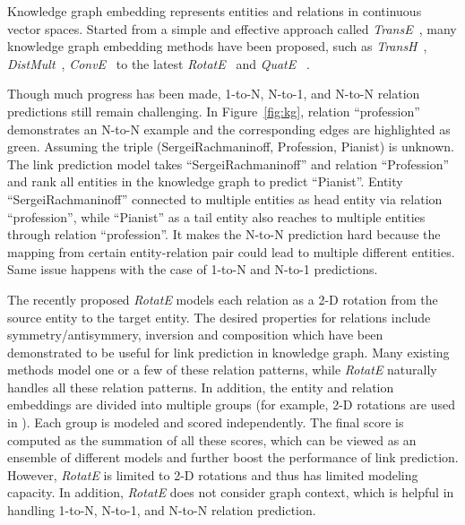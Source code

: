 \documentclass[11pt,a4paper]{article}
\begin{document}
Knowledge graph embedding represents entities and relations in continuous vector spaces.
Started from a simple and effective approach called {\it TransE}~\cite{bordes2013translating}, many knowledge graph embedding methods have been proposed, such as {\it TransH}~\cite{wang2014knowledge}, {\it DistMult}~\cite{yang2014distmult}, {\it ConvE}~\cite{dettmers2017conve} to the latest {\it RotatE}~\cite{Sun2019RotatEKG} and {\it QuatE }~\cite{zhang2019quaternion}.


Though much progress has been made, 1-to-N, N-to-1, and N-to-N relation predictions \cite{bordes2013translating,wang2014knowledge} still remain challenging. In Figure~\ref{fig:kg}, relation ``profession'' demonstrates an N-to-N example and the corresponding edges are highlighted as green. Assuming the triple (SergeiRachmaninoff, Profession, Pianist) is unknown.
The link prediction model takes ``SergeiRachmaninoff'' and relation ``Profession'' and rank all entities in the knowledge graph to predict ``Pianist''. Entity ``SergeiRachmaninoff'' connected to multiple  entities as head entity via relation ``profession'', while ``Pianist'' as a tail entity also reaches to multiple entities through relation ``profession''. It makes the N-to-N prediction hard because the mapping from certain entity-relation pair could lead to multiple different entities.
Same issue happens with the case of 1-to-N and N-to-1 predictions.

The recently proposed {\it RotatE} \cite{Sun2019RotatEKG} models each relation as a 2-D rotation from the source entity to the target entity.
The desired properties for relations include symmetry/antisymmery, inversion and composition which have been demonstrated to be useful for link prediction in knowledge graph. Many existing methods model one or a few of these relation patterns, while {\it RotatE} naturally handles all these relation patterns. 
In addition, the entity and relation embeddings are divided into multiple groups (for example,  2-D rotations are used in \cite{Sun2019RotatEKG}). 
Each group is modeled and scored independently. The final score is computed as the summation of all these scores, which can be viewed as an ensemble of different models and further boost the performance of link prediction. However, {\it RotatE} is limited to 2-D rotations and thus has limited modeling capacity. In addition, {\it RotatE} does not consider graph context, which is helpful in handling 1-to-N, N-to-1, and N-to-N relation prediction.
 
\end{document}
